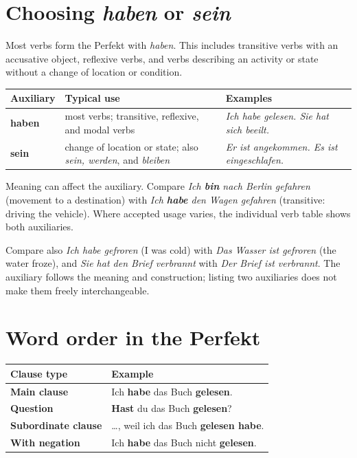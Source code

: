 \section{Choosing \textit{haben} or \textit{sein}}

Most verbs form the Perfekt with \textit{haben}. This includes transitive
verbs with an accusative object, reflexive verbs, and verbs describing an
activity or state without a change of location or condition.

\begin{center}
\small
{}
\begin{tabularx}{\textwidth}{@{}>{\bfseries}l X X@{}}
\toprule
Auxiliary & Typical use & Examples \\
\midrule
haben & most verbs; transitive, reflexive, and modal verbs
      & \textit{Ich habe gelesen. Sie hat sich beeilt.} \\
sein & change of location or state; also \textit{sein, werden}, and
       \textit{bleiben}
     & \textit{Er ist angekommen. Es ist eingeschlafen.} \\
\bottomrule
\end{tabularx}
\end{center}

Meaning can affect the auxiliary. Compare
\textit{Ich \textbf{bin} nach Berlin gefahren} (movement to a destination)
with \textit{Ich \textbf{habe} den Wagen gefahren} (transitive: driving the
vehicle). Where accepted usage varies, the individual verb table shows both
auxiliaries.

Compare also \textit{Ich habe gefroren} (I was cold) with
\textit{Das Wasser ist gefroren} (the water froze), and
\textit{Sie hat den Brief verbrannt} with
\textit{Der Brief ist verbrannt}. The auxiliary follows the meaning and
construction; listing two auxiliaries does not make them freely interchangeable.

\section{Word order in the Perfekt}

\begin{center}
\small
{}
\begin{tabularx}{\textwidth}{@{}>{\bfseries}l X@{}}
\toprule
Clause type & Example \\
\midrule
Main clause & Ich \textbf{habe} das Buch \textbf{gelesen}. \\
Question & \textbf{Hast} du das Buch \textbf{gelesen}? \\
Subordinate clause & \ldots{}, weil ich das Buch \textbf{gelesen habe}. \\
With negation & Ich \textbf{habe} das Buch nicht \textbf{gelesen}. \\
\bottomrule
\end{tabularx}
\end{center}

